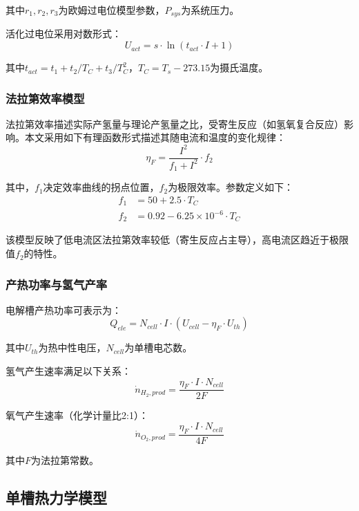其中$r_1,r_2,r_3$为欧姆过电位模型参数，$P_{sys}$为系统压力。

活化过电位采用对数形式：
\begin{equation}
  U_{act} = s \cdot \ln(t_{act} \cdot I + 1)
\end{equation}

其中$t_{act} = t_1 + t_2/T_C + t_3/T_C^2$，$T_C = T_s - 273.15$为摄氏温度。

\subsubsection{法拉第效率模型}

法拉第效率描述实际产氢量与理论产氢量之比，受寄生反应（如氢氧复合反应）影响。本文采用如下有理函数形式描述其随电流和温度的变化规律：
\begin{equation}
  \eta_F = \frac{I^2}{f_1 + I^2} \cdot f_2
\end{equation}

其中，$f_1$决定效率曲线的拐点位置，$f_2$为极限效率。参数定义如下：
\begin{align}
  f_1 &= 50 + 2.5 \cdot T_C \\
  f_2 &= 0.92 - 6.25 \times 10^{-6} \cdot T_C
\end{align}

该模型反映了低电流区法拉第效率较低（寄生反应占主导），高电流区趋近于极限值$f_2$的特性。

\subsubsection{产热功率与氢气产率}

电解槽产热功率可表示为：
\begin{equation}
  Q_{ele} = N_{cell} \cdot I \cdot (U_{cell} - \eta_F \cdot U_{th})
\end{equation}

其中$U_{th}$为热中性电压，$N_{cell}$为单槽电芯数。

氢气产生速率满足以下关系：
\begin{equation}
  \dot{n}_{H_2,prod} = \frac{\eta_F \cdot I \cdot N_{cell}}{2F}
\end{equation}

氧气产生速率（化学计量比2:1）：
\begin{equation}
  \dot{n}_{O_2,prod} = \frac{\eta_F \cdot I \cdot N_{cell}}{4F}
\end{equation}

其中$F$为法拉第常数。

\subsection{单槽热力学模型}

